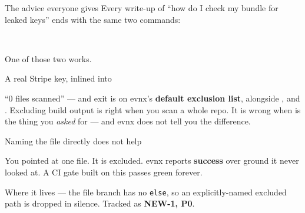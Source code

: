 \documentclass[aspectratio=169,10pt]{beamer}
\begin{document}
\begin{frame}{The advice everyone gives}
  Every write-up of ``how do I check my bundle for leaked keys'' ends with the
  same two commands:

  \vspace{0.8em}
  \begin{center}\large
   \\[0.4em]
  \end{center}

  \vspace{0.9em}
  One of those two works.

  \vspace{0.6em}
\end{frame}

\begin{frame}[fragile]{A real Stripe key, inlined into }

  \vspace{0.4em}
  \begin{trap}{``0 files scanned'' --- and exit \exitzero}
     is on evnx's \textbf{default exclusion list}, alongside
    ,  and . Excluding build
    output is right when you scan a whole repo. It is wrong when 
    is the thing you \emph{asked} for --- and evnx does not tell you the
    difference.
  \end{trap}
\end{frame}

\begin{frame}[fragile]{Naming the file directly does not help}

  \vspace{0.4em}
  {\footnotesize You pointed at one file. It is excluded. evnx reports
  \textbf{success} over ground it never looked at. A CI gate built on this
  passes green forever.}

  \vspace{0.5em}
  \begin{block}{\small Where it lives}
     --- the file branch has no
    \texttt{else}, so an explicitly-named excluded path is dropped in silence.
    Tracked as \textbf{NEW-1, P0}.
  \end{block}
\end{frame}
\end{document}

